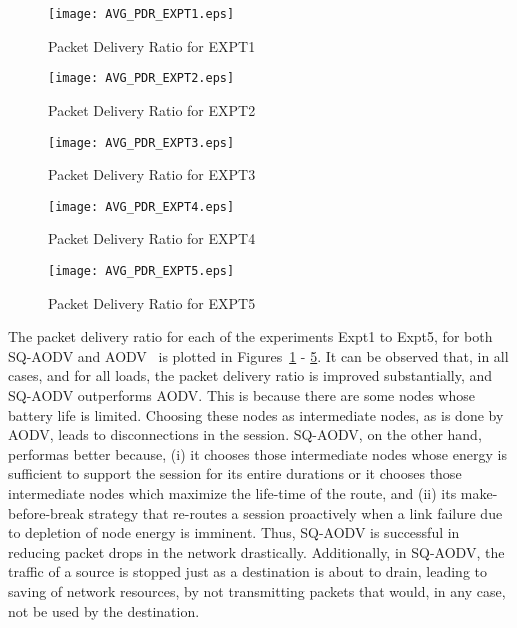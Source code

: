 \begin{figure}[htbp]
	\centering
	\texttt{[image: AVG\_PDR\_EXPT1.eps]}
	\caption{Packet Delivery Ratio for EXPT1}
	\label{fig52}
\end{figure}


\begin{figure}[htbp]
	\centering
	\texttt{[image: AVG\_PDR\_EXPT2.eps]}
	\caption{Packet Delivery Ratio for EXPT2}
	\label{fig53}
\end{figure}


\begin{figure}[htbp]
	\centering
	\texttt{[image: AVG\_PDR\_EXPT3.eps]}
	\caption{Packet Delivery Ratio for EXPT3}
	\label{fig54}
\end{figure}


\begin{figure}[htbp]
	\centering
	\texttt{[image: AVG\_PDR\_EXPT4.eps]}
	\caption{Packet Delivery Ratio for EXPT4}
	\label{fig55}
\end{figure}


\begin{figure}[htbp]
	\centering
	\texttt{[image: AVG\_PDR\_EXPT5.eps]}
	\caption{Packet Delivery Ratio for EXPT5}
	\label{fig56}
\end{figure}

The packet delivery ratio for each of the experiments Expt1 to Expt5, for both SQ-AODV and AODV~\cite{aodv} is plotted in Figures~\ref{fig52} - \ref{fig56}. It can be observed that, in all cases, and for all loads, the packet delivery ratio is improved substantially, and SQ-AODV outperforms AODV. This is because there are some nodes whose battery life is limited. Choosing these nodes as intermediate nodes, as is done by AODV, leads to disconnections in the session. SQ-AODV, on the other hand, performas better because, (i) it chooses those intermediate nodes whose energy is sufficient to support the session for its entire durations or it chooses those intermediate nodes which maximize the life-time of the route, and (ii) its make-before-break strategy that re-routes a session proactively when a  link failure due to depletion of node energy is imminent. Thus, SQ-AODV is successful in reducing packet drops in the network drastically. Additionally, in SQ-AODV, the traffic of a source is stopped just as a destination is about to drain, leading to saving of network resources, by not transmitting packets that would, in any case, not be used by the destination.



